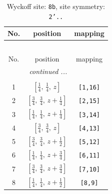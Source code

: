 \documentclass[fleqn,8pt]{jsarticle}
\begin{document}
\begin{longtable}{ccc}
\caption{Wyckoff site: {\tt 8b}, site symmetry: {\tt 2'..}}
 \\
 \hline \hline
No. & position & mapping \\ \hline \endfirsthead

\multicolumn{2}{l}{\tablename\ \thetable{}} \\
 \hline \hline
No. & position & mapping \\ \hline \endhead

 \hline \hline
\multicolumn{2}{r}{\footnotesize\it continued ...} \\ \endfoot

 \hline \hline
\multicolumn{2}{r}{} \\ \endlastfoot

1 & $\left[ \frac{1}{4},\, \frac{1}{4},\, z \right]$ & {\tt [1,16]} \\ \hline
2 & $\left[ \frac{3}{4},\, \frac{3}{4},\, z + \frac{1}{4} \right]$ & {\tt [2,15]} \\ \hline
3 & $\left[ \frac{1}{4},\, \frac{1}{4},\, z + \frac{1}{4} \right]$ & {\tt [3,14]} \\ \hline
4 & $\left[ \frac{3}{4},\, \frac{3}{4},\, z \right]$ & {\tt [4,13]} \\ \hline
5 & $\left[ \frac{3}{4},\, \frac{3}{4},\, z + \frac{1}{2} \right]$ & {\tt [5,12]} \\ \hline
6 & $\left[ \frac{1}{4},\, \frac{1}{4},\, z + \frac{3}{4} \right]$ & {\tt [6,11]} \\ \hline
7 & $\left[ \frac{3}{4},\, \frac{3}{4},\, z + \frac{3}{4} \right]$ & {\tt [7,10]} \\ \hline
8 & $\left[ \frac{1}{4},\, \frac{1}{4},\, z + \frac{1}{2} \right]$ & {\tt [8,9]} \\
\end{longtable}
\renewcommand{\arraystretch}{1.2}
\end{document}
